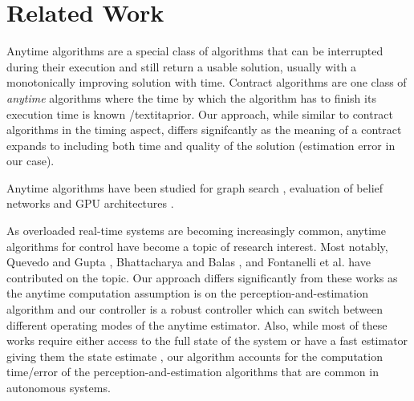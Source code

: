 \section{Related Work}
\label{related}

Anytime algorithms \cite{boddy} are a special class of algorithms that can be interrupted during their execution and still return a usable solution, usually with a monotonically improving solution with time. Contract algorithms \cite{zilbersteinAImag} are one class of \emph{anytime} algorithms where the time by which the algorithm has to finish its execution time is known /textit{aprior}. Our approach, while similar to contract algorithms in the timing aspect, differs signifcantly as the meaning of a contract expands to including both time and quality of the solution (estimation error in our case).

Anytime algorithms have been studied for graph search \cite{maxim}, evaluation of belief networks \cite{wellman} and GPU architectures \cite{RTSSanytime}.

As overloaded real-time systems are becoming increasingly common, anytime algorithms for control have become a topic of research interest. Most notably, Quevedo and Gupta \cite{sequence}, Bhattacharya and Balas \cite{balas}, and Fontanelli et al. \cite{fontanelli} have contributed on the topic. Our approach differs significantly from these works as the anytime computation assumption is on the perception-and-estimation algorithm and our controller is a robust controller which can switch between different operating modes of the anytime estimator. Also, while most of these works require either access to the full state of the system or have a fast estimator giving them the state estimate \cite{balas}, our algorithm accounts for the computation time/error of the perception-and-estimation algorithms that are common in autonomous systems.

